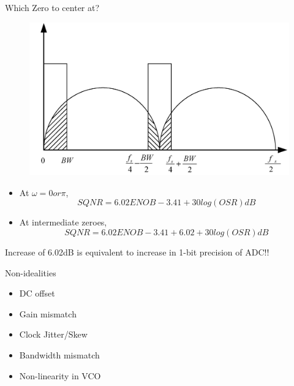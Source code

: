 \documentclass{beamer}
\begin{document}
\begin{frame}{Which Zero to center at?}
\begin{figure}
	\includegraphics[scale=0.2]{./figs/Bwplot.png}
\end{figure}
\pause
\vspace{-0.5cm}
\begin{itemize}
	\item At $\omega = 0 or \pi$,
	\vspace{-0.5cm}
	\begin{equation*}
		SQNR = 6.02ENOB - 3.41 + 30log(OSR)dB
	\end{equation*}
	\vspace{-1cm}
	\pause
	\item At intermediate zeroes,
	\vspace{-0.6cm}
	\begin{equation*}
		SQNR = 6.02ENOB - 3.41 + 6.02 + 30log(OSR)dB
	\end{equation*}
	\vspace{-1cm}
\end{itemize}
	\pause
	Increase of 6.02dB is equivalent to increase in 1-bit precision of ADC!!
\end{frame}

\begin{frame}{Non-idealities}
	\begin{itemize}
		\item DC offset
		\item Gain mismatch
		\item Clock Jitter/Skew
		\item Bandwidth mismatch
		\item Non-linearity in VCO
	\end{itemize}
\end{frame}
\end{document}
